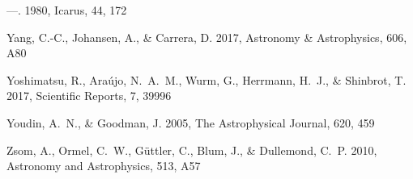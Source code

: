 \begin{thebibliography}{}
---. 1980, Icarus, 44, 172

Yang, C.-C., Johansen, A., \& Carrera, D. 2017, Astronomy \& Astrophysics, 606,
  A80

{Yoshimatsu}, R., {Ara{\'u}jo}, N.~A.~M., {Wurm}, G., {Herrmann}, H.~J., \&
  {Shinbrot}, T. 2017, Scientific Reports, 7, 39996

Youdin, A.~N., \& Goodman, J. 2005, The Astrophysical Journal, 620, 459

{Zsom}, A., {Ormel}, C.~W., {G{\"u}ttler}, C., {Blum}, J., \& {Dullemond},
  C.~P. 2010, Astronomy and Astrophysics, 513, A57

\end{thebibliography}






